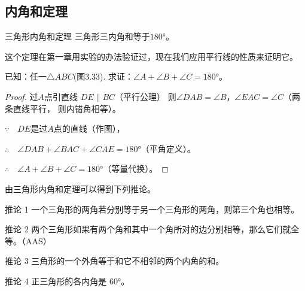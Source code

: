 \subsection{内角和定理}

\begin{Theorem}
  {三角形内角和定理} 三角形三内角和等于$\ang{180}$。 
\end{Theorem}

这个定理在第一章用实验的办法验证过，现在我们应用平行线的性质来证明它。

已知：任一$\triangle ABC$(图3.33). 求证：$\angle A+\angle B+
\angle C=\ang{180}$。

\begin{figure}
\begin{tikzpicture}
\end{tikzpicture}
    \caption{}
\end{figure}

\begin{proof}
    过$A$点引直线
$DE\parallel BC$（平行公理）
则$\angle DAB=\angle B$，$\angle EAC=\angle C$（两条直线平行，
则内错角相等）。

$\because\quad DE$是过$A$点的直线（作图），

$\therefore\quad \angle DAB+\angle BAC+\angle CAE=\ang{180}$（平角定义）。

$\therefore\quad \angle A+\angle B+\angle C=\ang{180}$（等量代换）。
\end{proof}

由三角形内角和定理可以得到下列推论。

\begin{Deduction}{推论 1} 
一个三角形的两角若分别等于另一个三角形的两角，则第三个角也相等。
\end{Deduction}


\begin{Deduction}{推论 2}
两个三角形如果有两个角和其中一个角所对的边分别相等，那么它们就全等。（AAS）
\end{Deduction}


\begin{Deduction}{推论 3}
三角形的一个外角等于和它不相邻的两个内角的和。
\end{Deduction}

\begin{Deduction}{推论 4}
正三角形的各内角是 \ang{60}。
\end{Deduction}

